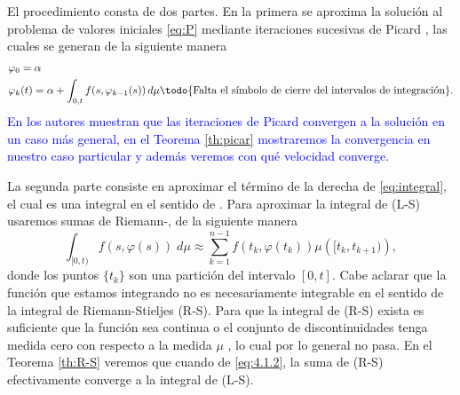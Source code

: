 El procedimiento consta de dos partes. En la primera se aproxima la solución al problema de valores iniciales \ref{eq:P} mediante iteraciones sucesivas de Picard 
\cite{Simmons}, las cuales se generan de la siguiente manera
\begin{equation*}
    \begin{split}
        &\varphi_0=\alpha\\
        &\varphi_k(t)=\alpha+\int_{0,t}f(s,\varphi_{k-1}(s)) \,d\mu\textrm{\todo{Falta el símbolo de cierre del intervalos de integración}}.
    \end{split}
\end{equation*}
\textcolor{blue}{En \cite{P.Mazzone} los autores muestran que   las iteraciones de Picard convergen  a la solución en un caso más general, en el Teorema \ref{th:picar} mostraremos la convergencia en nuestro caso particular y además veremos con qué velocidad converge}.




La segunda parte consiste en aproximar el término de la derecha de \eqref{eq:integral}, el cual es una integral en el sentido de . Para aproximar la integral de (L-S) usaremos  sumas de Riemann-, de la siguiente manera
\begin{equation}\label{eq:4.1.2}
    \int_{[0,t)}f(s,\varphi(s))\; d\mu \approx \sum_{k=1}^{n-1}f(t_k,\varphi(t_k))\mu\left([t_k,t_{k+1})\right),
\end{equation}
donde los puntos $\{t_k\}$ son una partición del intervalo $[0,t]$. Cabe aclarar que la función  que estamos integrando no es necesariamente  integrable en el sentido de la integral de Riemann-Stieljes (R-S). Para que la integral de (R-S) exista es suficiente que la función sea continua \cite{Lakshmikan} o el conjunto de discontinuidades tenga medida cero con respecto a la medida $\mu$ \cite{Hobson}, lo cual por lo general no pasa. En el Teorema \ref{th:R-S} veremos que cuando   de \eqref{eq:4.1.2}, la suma de (R-S) efectivamente converge a la integral de (L-S).





